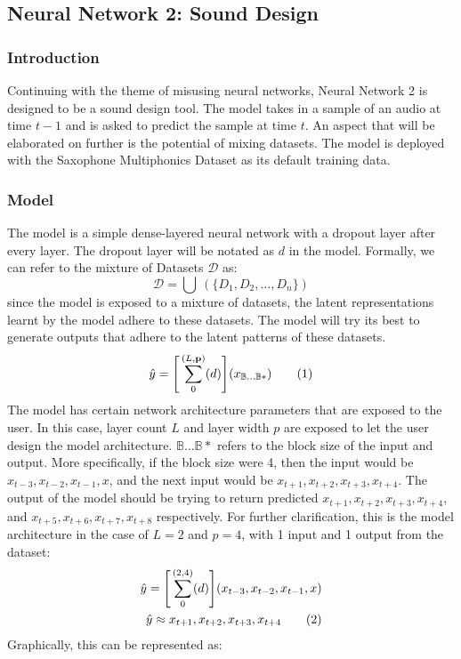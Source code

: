 \documentclass{article}
\newcommand\numberthis{\addtocounter{equation}{1}\tag{\theequation}}
\begin{document}
\subsection{Neural Network 2: Sound Design}
\subsubsection{Introduction}
Continuing with the theme of misusing neural networks, Neural Network 2 is designed to be a sound design tool. The model takes in a sample of an audio at time $t-1$ and is asked to predict the sample at time $t$. An aspect that will be elaborated on further is the potential of mixing datasets. The model is deployed with the Saxophone Multiphonics Dataset as its default training data.
\subsubsection{Model}
The model is a simple dense-layered neural network with a dropout layer after every layer. The dropout layer will be notated as $d$ in the model. Formally, we can refer to the mixture of Datasets $\mathcal{D}$ as:
\begin{equation}
	\mathcal{D} = \bigcup \  ( \{ D_1, D_2, \dots, D_n \} )
\end{equation}
since the model is exposed to a mixture of datasets, the latent representations learnt by the model adhere to these datasets. The model will try its best to generate outputs that adhere to the latent patterns of these datasets.
\begin{align*}
	\hat{y} = \Bigg[\sum^{(L,\mathbf{p})}_0(d)\Bigg](x_{\mathbb{B} \dots \mathbb{B}*})
	\numberthis
\end{align*}
The model has certain network architecture parameters that are exposed to the user. In this case, layer count $L$ and layer width $p$ are exposed to let the user design the model architecture. $\mathbb{B} \dots \mathbb{B}*$ refers to the block size of the input and output. More specifically, if the block size were 4, then the input would be $x_{t-3},x_{t-2}, x_{t-1}, x$, and the next input would be $x_{t+1}, x_{t+2}, x_{t+3}, x_{t+4}$. The output of the model should be trying to return predicted $x_{t+1}, x_{t+2}, x_{t+3}, x_{t+4}$, and $x_{t+5}, x_{t+6}, x_{t+7}, x_{t+8}$ respectively. For further clarification, this is the model architecture in the case of $L=2$ and $p=4$, with 1 input and 1 output from the dataset:
\begin{align*}
	\hat{y} = \Bigg[\sum^{(2,4)}_0(d)\Bigg](x_{t-3},x_{t-2}, x_{t-1}, x) \\
	\hat{y} \approx x_{t+1}, x_{t+2}, x_{t+3}, x_{t+4}
	\numberthis
\end{align*}
Graphically, this can be represented as:
\end{document}
